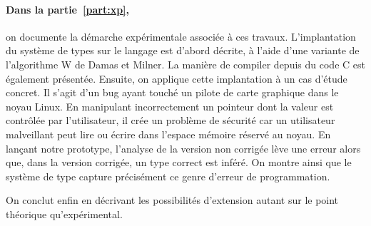 \paragraph{Dans la partie~\ref{part:xp},} on documente la démarche expérimentale
associée à ces travaux. L'implantation du système de types sur le langage
\newspeak est d'abord décrite, à l'aide d'une variante de l'algorithme W de
Damas et Milner. La manière de compiler depuis du code C est également
présentée. Ensuite, on applique cette implantation à un cas d'étude concret. Il
s'agit d'un bug ayant touché un pilote de carte graphique dans le noyau Linux.
En manipulant incorrectement un pointeur dont la valeur est contrôlée par
l'utilisateur, il crée un problème de sécurité car un utilisateur malveillant
peut lire ou écrire dans l'espace mémoire réservé au noyau. En lançant notre
prototype, l'analyse de la version non corrigée lève une erreur alors que, dans
la version corrigée, un type correct est inféré. On montre ainsi que le système
de type capture précisément ce genre d'erreur de programmation.

On conclut enfin en décrivant les possibilités d'extension autant sur le point
théorique qu'expérimental.

